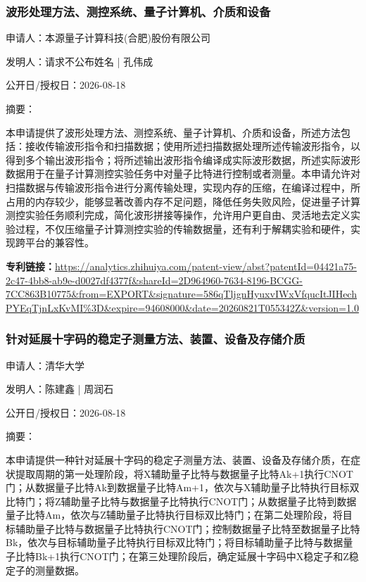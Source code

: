 \documentclass[12pt,a4paper]{ctexart}
\begin{document}
\subsubsection{ 波形处理方法、测控系统、量子计算机、介质和设备 }

申请人：本源量子计算科技(合肥)股份有限公司

发明人：请求不公布姓名 | 孔伟成

公开日/授权日：2026-08-18

摘要：

本申请提供了波形处理方法、测控系统、量子计算机、介质和设备，所述方法包括：接收传输波形指令和扫描数据；使用所述扫描数据处理所述传输波形指令，以得到多个输出波形指令；将所述输出波形指令编译成实际波形数据，所述实际波形数据用于在量子计算测控实验任务中对量子比特进行控制或者测量。本申请允许对扫描数据与传输波形指令进行分离传输处理，实现内存的压缩，在编译过程中，所占用的内存较少，能够显著改善内存不足问题，降低任务失败风险，促进量子计算测控实验任务顺利完成，简化波形拼接等操作，允许用户更自由、灵活地去定义实验过程，不仅压缩量子计算测控实验的传输数据量，还有利于解耦实验和硬件，实现跨平台的兼容性。

\noindent\textbf{专利链接：}\url{https://analytics.zhihuiya.com/patent-view/abst?patentId=04421a75-2c47-4bb8-ab9e-d0027df4377f&shareId=2D964960-7634-8196-BCGG-7CC863B10775&from=EXPORT&signature=586qTljgnHyuxvIWxVfqucItJIHechPYEqTjnLxKvMI%3D&expire=94608000&date=20260821T055342Z&version=1.0}

\subsubsection{ 针对延展十字码的稳定子测量方法、装置、设备及存储介质 }

申请人：清华大学

发明人：陈建鑫 | 周润石

公开日/授权日：2026-08-18

摘要：

本申请提供一种针对延展十字码的稳定子测量方法、装置、设备及存储介质，在症状提取周期的第一处理阶段，将X辅助量子比特与数据量子比特Ak+1执行CNOT门；从数据量子比特Ak到数据量子比特Am+1，依次与X辅助量子比特执行目标双比特门；将Z辅助量子比特与数据量子比特执行CNOT门；从数据量子比特到数据量子比特Am，依次与Z辅助量子比特执行目标双比特门；在第二处理阶段，将目标辅助量子比特与数据量子比特执行CNOT门；控制数据量子比特至数据量子比特Bk，依次与目标辅助量子比特执行目标双比特门；将目标辅助量子比特与数据量子比特Bk+1执行CNOT门；在第三处理阶段后，确定延展十字码中X稳定子和Z稳定子的测量数据。
\end{document}
